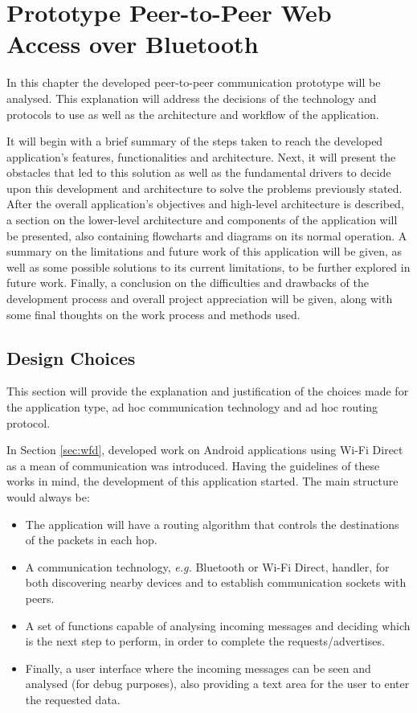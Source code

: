 \chapter{Prototype Peer-to-Peer Web Access over Bluetooth}
\label{chapter:work}

In this chapter the developed peer-to-peer communication prototype will be analysed. This explanation will address the decisions of the technology and protocols to use as well as the architecture and workflow of the application.

It will begin with a brief summary of the steps taken to reach the developed application's features, functionalities and architecture. Next, it will present the obstacles that led to this solution as well as the fundamental drivers to decide upon this development and architecture to solve the problems previously stated. After the overall application's objectives and high-level architecture is described, a section on the lower-level architecture and components of the application will be presented, also containing flowcharts and diagrams on its normal operation. A summary on the limitations and future work of this application will be given, as well as some possible solutions to its current limitations, to be further explored in future work. Finally, a conclusion on the difficulties and drawbacks of the development process and overall project appreciation will be given, along with some final thoughts on the work process and methods used.

\section{Design Choices}

This section will provide the explanation and justification of the choices made for the application type, ad hoc communication technology and ad hoc routing protocol.

In Section \ref{sec:wfd}, developed work on Android applications using Wi-Fi Direct as a mean of communication was introduced. Having the guidelines of these works in mind, the development of this application started. The main structure would always be:
\begin{itemize}
	\item The application will have a routing algorithm that controls the destinations of the packets in each hop.
	\item A communication technology, \textit{e.g.} Bluetooth or Wi-Fi Direct, handler, for both discovering nearby devices and to establish communication sockets with peers.
	\item A set of functions capable of analysing incoming messages and deciding which is the next step to perform, in order to complete the requests/advertises.
	\item Finally, a user interface where the incoming messages can be seen and analysed (for debug purposes), also providing a text area for the user to enter the requested data.
\end{itemize}

